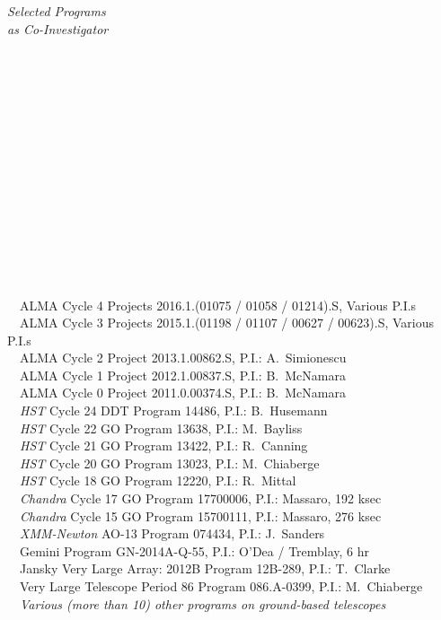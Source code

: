 \documentclass[11pt]{article}
\begin{document}
\hspace{2.5mm} \parbox{1.5in}{{\it Selected Programs \\ as Co-Investigator \\\\\\\\\\\\\\\\\\\\\\\\\\\\\\}} \parbox{5.15in}{
\textbullet~~ALMA Cycle 4 Projects 2016.1.(01075 / 01058 / 01214).S, Various P.I.s\\
\textbullet~~ALMA Cycle 3 Projects 2015.1.(01198 / 01107 / 00627 / 00623).S, Various P.I.s\\
\textbullet~~ALMA Cycle 2 Project 2013.1.00862.S, P.I.: A.~Simionescu\\
\textbullet~~ALMA Cycle 1 Project 2012.1.00837.S, P.I.: B.~McNamara\\
\textbullet~~ALMA Cycle 0 Project 2011.0.00374.S, P.I.: B.~McNamara\\
\textbullet~~{\it HST}  Cycle 24 DDT Program 14486, P.I.: B.~Husemann\\
\textbullet~~{\it HST}  Cycle 22 GO Program 13638, P.I.: M.~Bayliss\\
\textbullet~~{\it HST}  Cycle 21 GO Program 13422, P.I.: R.~Canning\\
\textbullet~~{\it HST}  Cycle 20 GO Program 13023, P.I.: M.~Chiaberge\\
\textbullet~~{\it HST}  Cycle 18 GO Program 12220, P.I.: R.~Mittal\\
\textbullet~~{\it Chandra} Cycle 17 GO Program 17700006, P.I.: Massaro, 192 ksec\\
\textbullet~~{\it Chandra} Cycle 15 GO Program 15700111, P.I.: Massaro, 276 ksec\\
\textbullet~~{\it XMM-Newton}  AO-13 Program 074434, P.I.: J.~Sanders\\
\textbullet~~Gemini Program GN-2014A-Q-55, P.I.: O'Dea / Tremblay, 6 hr\\
\textbullet~~Jansky Very Large Array:  2012B Program 12B-289, P.I.: T.~Clarke\\
\textbullet~~Very Large Telescope Period 86 Program 086.A-0399, P.I.: M.~Chiaberge\\
\textbullet~~{\it Various (more than 10) other programs on ground-based telescopes}
} \\
\end{document}
